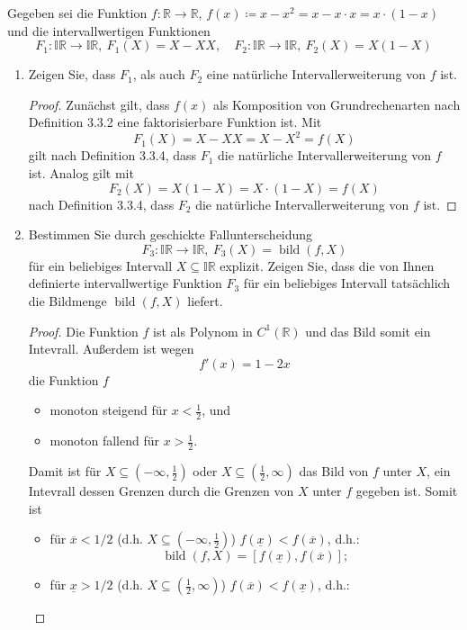 \documentclass[12pt]{extreport} %
\newcommand{\R}{\mathbb{R}}
\begin{document}
Gegeben sei die Funktion $f \colon \R \rightarrow \R$, $f(x) \coloneqq x - x^2 = x - x \cdot x = x \cdot \left( 1 - x \right)$ und die intervallwertigen Funktionen
	$$ F_1 \colon \mathbb{IR} \rightarrow \mathbb{IR}, ~ F_1(X) = X - X X, \quad F_2 \colon \mathbb{IR} \rightarrow \mathbb{IR}, ~ F_2(X) = X(1- X) $$
\begin{enumerate}
	\item Zeigen Sie, dass $F_1$, als auch $F_2$ eine natürliche Intervallerweiterung von $f$ ist.
		\begin{proof} 
			Zunächst gilt, dass $f(x)$ als Komposition von Grundrechenarten nach Definition 3.3.2 eine faktorisierbare Funktion ist. Mit 
			$$ F_1(X) = X-XX = X-X^2 = f(X) $$
			gilt nach Definition 3.3.4, dass $F_1$ die natürliche Intervallerweiterung von $f$ ist. Analog gilt mit 
			$$ F_2(X)=X(1-X)= X \cdot (1 - X) =f(X) $$
			nach Definition 3.3.4, dass $F_2$ die natürliche Intervallerweiterung von $f$ ist.
		\end{proof}
	\item Bestimmen Sie durch geschickte Fallunterscheidung
		$$ F_3 \colon \mathbb{IR} \rightarrow \mathbb{IR}, ~ F_3(X) = \operatorname{bild}(f, X) $$
		für ein beliebiges Intervall $X \subseteq \mathbb{IR}$ explizit. Zeigen Sie, dass die von Ihnen definierte intervallwertige Funktion $F_3$ für ein beliebiges Intervall tatsächlich die Bildmenge $\operatorname{bild}(f, X)$ liefert.
		\begin{proof}
			Die Funktion $f$ ist als Polynom in $C^1(\R)$ und das Bild somit ein  Intevrall. Außerdem ist wegen 
				$$ f'(x) = 1 - 2x $$ 
			die Funktion $f$ 
			\begin{itemize}
				\item monoton steigend für $x < \frac{1}{2}$, und
				\item monoton fallend für $x > \frac{1}{2}$.
			\end{itemize}
			Damit ist für $X \subseteq \left(-\infty, \frac{1}{2} \right)$ oder $X \subseteq \left(\frac{1}{2}, \infty \right)$ das Bild von $f$ unter $X$, ein Intevrall dessen Grenzen durch die Grenzen von $X$ unter $f$ gegeben ist. Somit ist
			\begin{itemize}
				\item für $\overline{x} < 1/2$ (d.h. $X \subseteq \left(-\infty, \frac{1}{2} \right)$) $f(\underline{x}) < f(\overline{x})$, d.h.:
					$$ \operatorname{bild}(f,X) = \left[f(\underline{x}), f(\overline{x}) \right]; $$
				\item für $\underline{x} >1/2$ (d.h. $X \subseteq \left(\frac{1}{2}, \infty \right)$) $f(\overline{x}) < f(\underline{x})$, d.h.:

\end{itemize}
\end{proof}
\end{enumerate}
\end{document}
